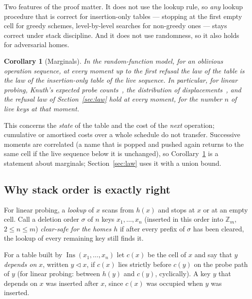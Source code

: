 \documentclass[11pt,a4paper]{article}
\newtheorem{corollary}[theorem]{Corollary}
\theoremstyle{definition}
\theoremstyle{remark}
\newcommand{\Z}{\mathbb{Z}}
\DeclareMathOperator{\Ins}{Ins}
\begin{document}
Two features of the proof matter. It does not use the lookup rule, so \emph{any} lookup procedure that is correct for insertion-only tables --- stopping at the first empty cell for greedy schemes, level-by-level searches for non-greedy ones --- stays correct under stack discipline. And it does not use randomness, so it also holds for adversarial homes.

\begin{corollary}[Marginals]\label{cor:marginal}
In the random-function model, for an oblivious operation sequence, at every moment up to the first refusal the law of the table is the law of the insertion-only table of the live sequence. In particular, for linear probing, Knuth's expected probe counts~\cite{knuth3}, the distribution of displacements~\cite{janson2005,viola2005}, and the refusal law of Section~\ref{sec:law} hold at every moment, for the number $n$ of live keys at that moment.
\end{corollary}

This concerns the \emph{state} of the table and the cost of the \emph{next} operation; cumulative or amortised costs over a whole schedule do not transfer. Successive moments are correlated (a name that is popped and pushed again returns to the same cell if the live sequence below it is unchanged), so Corollary~\ref{cor:marginal} is a statement about marginals; Section~\ref{sec:law} uses it with a union bound.

\subsection{Why stack order is exactly right}

For linear probing, a \emph{lookup} of $x$ scans from $h(x)$ and stops at $x$ or at an empty cell. Call a deletion order $\sigma$ of $n$ keys $x_1,\dots,x_n$ (inserted in this order into $\Z_m$, $2\le n\le m$) \emph{clear-safe for the homes $h$} if after every prefix of $\sigma$ has been cleared, the lookup of every remaining key still finds it.

For a table built by $\Ins(x_1,\dots,x_n)$ let $c(x)$ be the cell of $x$ and say that $y$ \emph{depends on} $x$, written $y\lhd x$, if $c(x)$ lies strictly before $c(y)$ on the probe path of $y$ (for linear probing: between $h(y)$ and $c(y)$, cyclically). A key $y$ that depends on $x$ was inserted after $x$, since $c(x)$ was occupied when $y$ was inserted.
\end{document}

